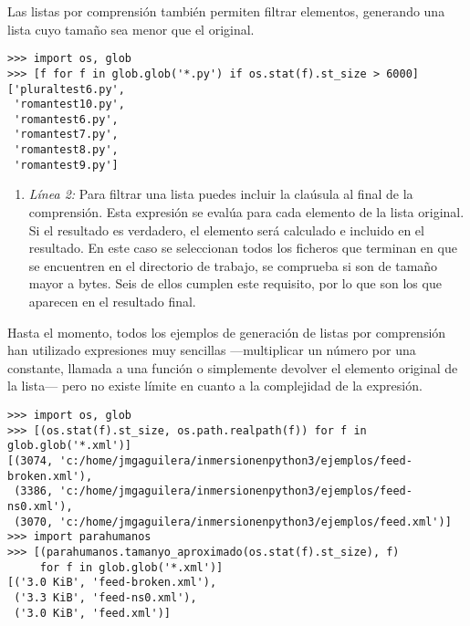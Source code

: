 Las listas por comprensión también permiten filtrar elementos, generando una lista cuyo tamaño sea menor que el original.

\noindent\begin{minipage}{\textwidth}
\begin{lstlisting}[mathescape=True]
>>> import os, glob
>>> [f for f in glob.glob('*.py') if os.stat(f).st_size > 6000]
['pluraltest6.py',
 'romantest10.py',
 'romantest6.py',
 'romantest7.py',
 'romantest8.py',
 'romantest9.py']
\end{lstlisting}
\end{minipage}

\begin{enumerate}

\item \emph{Línea 2:} Para filtrar una lista puedes incluir la claúsula  al final de la comprensión. Esta expresión se evalúa para cada elemento de la lista original. Si el resultado es verdadero, el elemento será calculado e incluido en el resultado. En este caso se seleccionan todos los ficheros que terminan en  que se encuentren en el directorio de trabajo, se comprueba si son de tamaño mayor a  bytes. Seis de ellos cumplen este requisito, por lo que son los que aparecen en el resultado final.

\end{enumerate}

Hasta el momento, todos los ejemplos de generación de listas por comprensión han utilizado expresiones muy sencillas ---multiplicar un número por una constante, llamada a una función o simplemente devolver el elemento original de la lista--- pero no existe límite en cuanto a la complejidad de la expresión.

\noindent\begin{minipage}{\textwidth}
\begin{lstlisting}[mathescape=True]
>>> import os, glob
>>> [(os.stat(f).st_size, os.path.realpath(f)) for f in glob.glob('*.xml')]
[(3074, 'c:/home/jmgaguilera/inmersionenpython3/ejemplos/feed-broken.xml'),
 (3386, 'c:/home/jmgaguilera/inmersionenpython3/ejemplos/feed-ns0.xml'),
 (3070, 'c:/home/jmgaguilera/inmersionenpython3/ejemplos/feed.xml')]
>>> import parahumanos
>>> [(parahumanos.tamanyo_aproximado(os.stat(f).st_size), f) 
     for f in glob.glob('*.xml')]
[('3.0 KiB', 'feed-broken.xml'),
 ('3.3 KiB', 'feed-ns0.xml'),
 ('3.0 KiB', 'feed.xml')]
\end{lstlisting}
\end{minipage}

